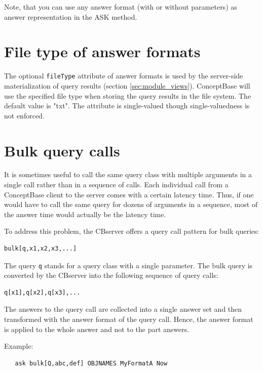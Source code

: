 Note, that you can use any answer format (with or without parameters) as
answer representation in the ASK method.


\section{File type of answer formats}
\label{sec:af_filetype}

The optional {\tt fileType} attribute of answer formats is used by the server-side materialization
of query results (section \ref{sec:module_views}). ConceptBase will use the specified file type when
storing the query results in the file system. The default value is "txt". 
The attribute is single-valued though single-valuedness is not enforced. 


\section{Bulk query calls}
\label{sec:bulkqueries}

It is sometimes useful to call the same query class with multiple arguments in a single call
rather than in a sequence of calls. Each individual call from a ConceptBase client to the server
comes with a certain latency time. Thus, if one would have to call the same query 
for dozens of arguments in a sequence, most of the answer time would actually be the latency time.

To address this problem, the CBserver offers a query call pattern for bulk queries:

{\small
\begin{verbatim}
bulk[q,x1,x2,x3,...]
\end{verbatim}
}

The query {\tt q} stands for a query class with a single parameter. The bulk query is converted
by the CBserver into the following sequence of query calls:

{\small
\begin{verbatim}
q[x1],q[x2],q[x3],...
\end{verbatim}
}

The answers to the query call are collected into a single answer set and then transformed with
the answer format of the query call. Hence, the answer format is applied to the whole answer
and not to the part answers.

Example:

{\small
\begin{verbatim}
   ask bulk[Q,abc,def] OBJNAMES MyFormatA Now
\end{verbatim}
}

